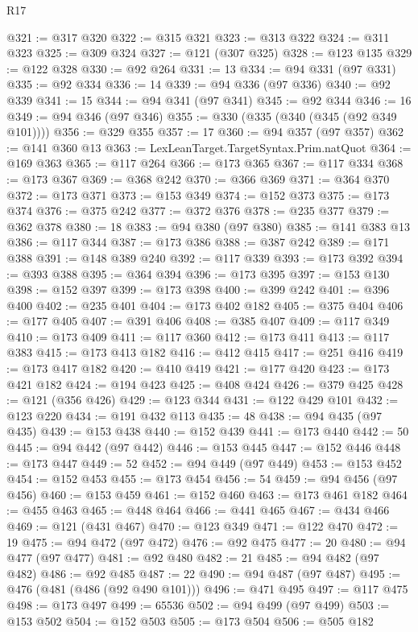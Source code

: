 \begin{lexlean}{R17}
\begin{coremodule}
@321 := @317 @320
@322 := @315 @321
@323 := @313 @322
@324 := @311 @323
@325 := @309 @324
@327 := @121 (@307 @325)
@328 := @123 @135
@329 := @122 @328
@330 := @92 @264
@331 := 13
@334 := @94 @331 (@97 @331)
@335 := @92 @334
@336 := 14
@339 := @94 @336 (@97 @336)
@340 := @92 @339
@341 := 15
@344 := @94 @341 (@97 @341)
@345 := @92 @344
@346 := 16
@349 := @94 @346 (@97 @346)
@355 := @330 (@335 (@340 (@345 (@92 @349 @101))))
@356 := @329 @355
@357 := 17
@360 := @94 @357 (@97 @357)
@362 := @141 @360 @13
@363 := LexLeanTarget.TargetSyntax.Prim.natQuot
@364 := @169 @363
@365 := @117 @264
@366 := @173 @365
@367 := @117 @334
@368 := @173 @367
@369 := @368 @242
@370 := @366 @369
@371 := @364 @370
@372 := @173 @371
@373 := @153 @349
@374 := @152 @373
@375 := @173 @374
@376 := @375 @242
@377 := @372 @376
@378 := @235 @377
@379 := @362 @378
@380 := 18
@383 := @94 @380 (@97 @380)
@385 := @141 @383 @13
@386 := @117 @344
@387 := @173 @386
@388 := @387 @242
@389 := @171 @388
@391 := @148 @389 @240
@392 := @117 @339
@393 := @173 @392
@394 := @393 @388
@395 := @364 @394
@396 := @173 @395
@397 := @153 @130
@398 := @152 @397
@399 := @173 @398
@400 := @399 @242
@401 := @396 @400
@402 := @235 @401
@404 := @173 @402 @182
@405 := @375 @404
@406 := @177 @405
@407 := @391 @406
@408 := @385 @407
@409 := @117 @349
@410 := @173 @409
@411 := @117 @360
@412 := @173 @411
@413 := @117 @383
@415 := @173 @413 @182
@416 := @412 @415
@417 := @251 @416
@419 := @173 @417 @182
@420 := @410 @419
@421 := @177 @420
@423 := @173 @421 @182
@424 := @194 @423
@425 := @408 @424
@426 := @379 @425
@428 := @121 (@356 @426)
@429 := @123 @344
@431 := @122 @429 @101
@432 := @123 @220
@434 := @191 @432 @113
@435 := 48
@438 := @94 @435 (@97 @435)
@439 := @153 @438
@440 := @152 @439
@441 := @173 @440
@442 := 50
@445 := @94 @442 (@97 @442)
@446 := @153 @445
@447 := @152 @446
@448 := @173 @447
@449 := 52
@452 := @94 @449 (@97 @449)
@453 := @153 @452
@454 := @152 @453
@455 := @173 @454
@456 := 54
@459 := @94 @456 (@97 @456)
@460 := @153 @459
@461 := @152 @460
@463 := @173 @461 @182
@464 := @455 @463
@465 := @448 @464
@466 := @441 @465
@467 := @434 @466
@469 := @121 (@431 @467)
@470 := @123 @349
@471 := @122 @470
@472 := 19
@475 := @94 @472 (@97 @472)
@476 := @92 @475
@477 := 20
@480 := @94 @477 (@97 @477)
@481 := @92 @480
@482 := 21
@485 := @94 @482 (@97 @482)
@486 := @92 @485
@487 := 22
@490 := @94 @487 (@97 @487)
@495 := @476 (@481 (@486 (@92 @490 @101)))
@496 := @471 @495
@497 := @117 @475
@498 := @173 @497
@499 := 65536
@502 := @94 @499 (@97 @499)
@503 := @153 @502
@504 := @152 @503
@505 := @173 @504
@506 := @505 @182

\end{coremodule}
\end{lexlean}
